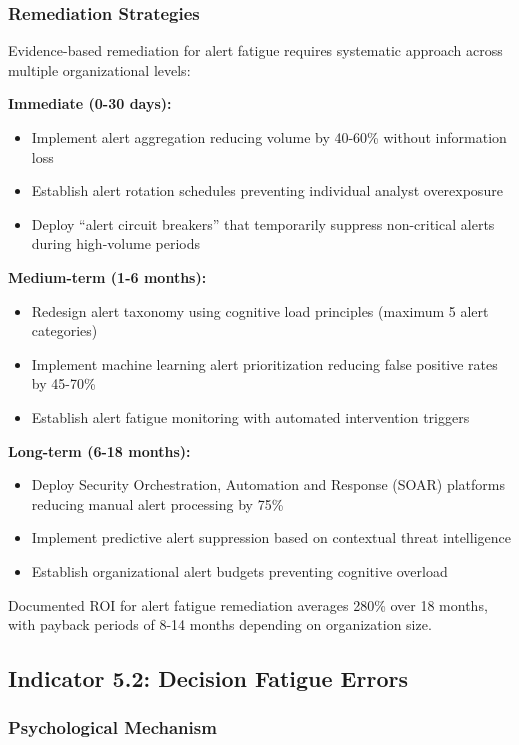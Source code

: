 \documentclass[11pt,a4paper]{article}
\begin{document}
\subsubsection{Remediation Strategies}

Evidence-based remediation for alert fatigue requires systematic approach across multiple organizational levels:

\textbf{Immediate (0-30 days):}
\begin{itemize}
\item Implement alert aggregation reducing volume by 40-60\% without information loss
\item Establish alert rotation schedules preventing individual analyst overexposure
\item Deploy ``alert circuit breakers'' that temporarily suppress non-critical alerts during high-volume periods
\end{itemize}

\textbf{Medium-term (1-6 months):}
\begin{itemize}
\item Redesign alert taxonomy using cognitive load principles (maximum 5 alert categories)
\item Implement machine learning alert prioritization reducing false positive rates by 45-70\%
\item Establish alert fatigue monitoring with automated intervention triggers
\end{itemize}

\textbf{Long-term (6-18 months):}
\begin{itemize}
\item Deploy Security Orchestration, Automation and Response (SOAR) platforms reducing manual alert processing by 75\%
\item Implement predictive alert suppression based on contextual threat intelligence
\item Establish organizational alert budgets preventing cognitive overload
\end{itemize}

Documented ROI for alert fatigue remediation averages 280\% over 18 months, with payback periods of 8-14 months depending on organization size.

\subsection{Indicator 5.2: Decision Fatigue Errors}

\subsubsection{Psychological Mechanism}
\end{document}
